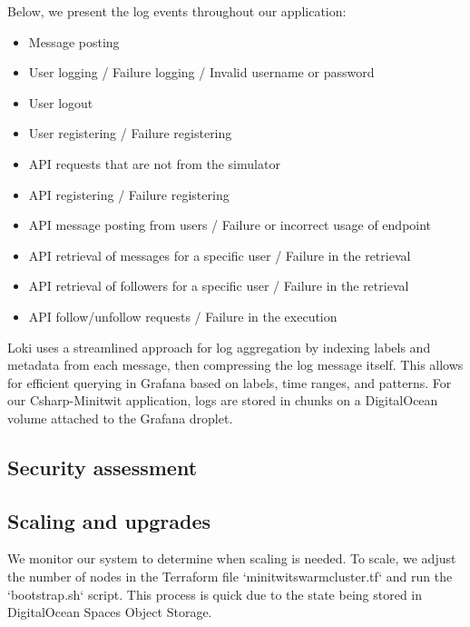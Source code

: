\noindent Below, we present the log events throughout our application:
\begin{itemize}
    \item Message posting
    \item User logging / Failure logging / Invalid username or password
    \item User logout
    \item User registering / Failure registering
    \item API requests that are not from the simulator
    \item API registering / Failure registering
    \item API message posting from users / Failure or incorrect usage of endpoint
    \item API retrieval of messages for a specific user / Failure in the retrieval
    \item API retrieval of followers for a specific user / Failure in the retrieval
    \item API follow/unfollow requests / Failure in the execution
    
\end{itemize}


\noindent Loki uses a streamlined approach for log aggregation by indexing labels and metadata from each message, then compressing the log message itself. This allows for efficient querying in Grafana based on labels, time ranges, and patterns. For our Csharp-Minitwit application, logs are stored in chunks on a DigitalOcean volume attached to the Grafana droplet.

\newpage

\subsection{Security assessment}


\subsection{Scaling and upgrades}
We monitor our system to determine when scaling is needed. To scale, we adjust the number of nodes in the Terraform file `minitwit\textunderscore swarm\textunderscore cluster.tf` and run the `bootstrap.sh` script. This process is quick due to the state being stored in DigitalOcean Spaces Object Storage.

